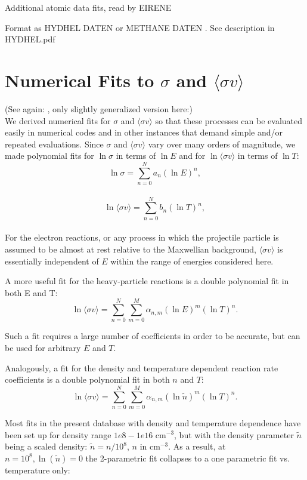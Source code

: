 \documentclass[12pt,dvipdfmx]{article}
\begin{document}
\newpage
Additional atomic data fits, read by EIRENE

Format as HYDHEL DATEN \cite{kn:Janev}
or METHANE DATEN \cite{kn:Ehrhardt}. See description in HYDHEL.pdf
\newpage
\section{Numerical Fits to $\sigma$ and $\langle\sigma v\rangle$}\label{sec1}

(See again: \cite{kn:Janev}, only slightly generalized version here:)
\\

We derived numerical fits for $\sigma$ and $\langle\sigma v\rangle$ so that these processes can be evaluated easily in
numerical codes and in other instances that demand simple and/or repeated evaluations. Since $\sigma$ and $\langle\sigma v\rangle$
vary over many orders of magnitude, we made polynomial fits for $\ln \sigma$ in terms of $\ln E$ and for $\ln \langle\sigma v\rangle$
in terms of $\ln T$:\\

      $$\ln \sigma = \sum_{n=0}^N a_n (\ln E)^n, $$\\


      $$\ln \langle\sigma v\rangle = \sum_{n=0}^N b_n (\ln T)^n, $$\\


For the electron reactions, or any process in which the projectile particle is assumed to be almost at rest
relative to the Maxwellian background, $\langle\sigma v\rangle$ is essentially independent of $E$ within the range of energies considered
here.

A more useful fit for the heavy-particle reactions is a double polynomial fit in both E and T:\\

      $$\ln \langle\sigma v\rangle = \sum_{n=0}^N\sum_{m=0}^M \alpha_{n,m}(\ln E)^m(\ln T)^n.$$

Such a fit requires a large number of coefficients in order to be accurate, but can be used for arbitrary
$E$ and $T$.

Analogously, a fit for the density and temperature dependent reaction rate coefficients
is a double polynomial fit in both $n$ and $T$:\\

      $$\ln \langle\sigma v\rangle = \sum_{n=0}^N\sum_{m=0}^M \alpha_{n,m}(\ln \tilde{n})^m(\ln T)^n.$$

Most fits in the present database with density and temperature dependence have been set up for density range $1e8 - 1e16$ cm$^{-3}$,
but with the density parameter $\tilde n$ being a scaled density: $\tilde n = n/10^8$, $n$ in cm$^{-3}$.
As a result, at $n = 10^8, \ln(\tilde{n}) = 0$ the 2-parametric fit collapses to a one parametric fit vs. temperature only:
\end{document}
